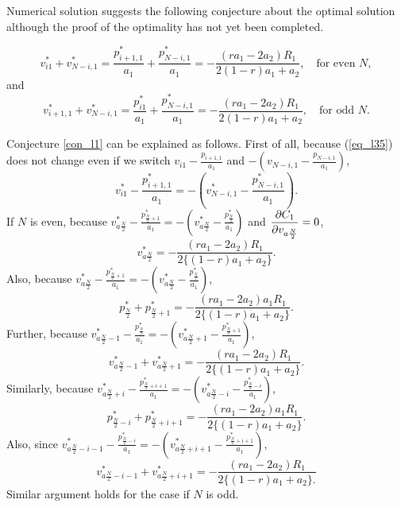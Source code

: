 Numerical solution suggests the following conjecture about the optimal solution although the proof of the optimality has not yet been completed. 
\begin{conjecture}\label{con_l1}
\begin{equation} \label{eq_l40}
 v_{i1}^*+v_{N-i,1}^* = \frac{p_{i+1,1}^*}{a_1} + \frac{p_{N-i,1}^*}{a_1} = -\frac{(ra_1-2a_2)R_1}{2{(1-r)a_1+a_2}}, \quad \mbox{for even } N,
\end{equation}
and
\begin{equation} \label{eq_l41}
 v_{i+1,1}^*+v_{N-i,1}^* = \frac{p_{i1}^*}{a_1} + \frac{p_{N-i,1}^*}{a_1} = -\frac{(ra_1-2a_2)R_1}{2{(1-r)a_1+a_2}}, \quad \mbox{for odd } N.
\end{equation}
\end{conjecture}

Conjecture \ref{con_l1} can be explained as follows.  First of all, because (\ref{eq_l35}) does not change even if we switch $\displaystyle v_{i1}-\frac{p_{i+1,1}}{a_1}$ and $\displaystyle -\left(v_{N-i,1}-\frac{p_{N-i,1}}{a_1}\right)$,
\[ %
  v_{i1}^*-\frac{p_{i+1,1}^*}{a_1}=-\left(v_{N-i,1}^*-\frac{p_{N-i,1}^*}{a_1}\right).  
\] %
If $N$ is even, because $\displaystyle v_{a\frac{N}{2}}^*-\frac{p_{\frac{N}{2}+1}^*}{a_1}=-(v_{a\frac{N}{2}}^*-\frac{p_{\frac{N}{2}}^*}{a_1})$ and $\displaystyle \frac{\partial C_1}{\partial v_{a\frac{N}{2}}}=0$,
\[ %
  v_{a\frac{N}{2}}^*=-\frac{(ra_1-2a_2)R_1}{2\{(1-r)a_1+a_2\}}.
\] %
Also, because $\displaystyle v_{a\frac{N}{2}}^*-\frac{p_{\frac{N}{2}+1}^*}{a_1}=-(v_{a\frac{N}{2}}^*-\frac{p_{\frac{N}{2}}^*}{a_1})$,
\[ %
  p_{\frac{N}{2}}^*+p_{\frac{N}{2}+1}^*=-\frac{(ra_1-2a_2)a_1R_1}{2\{(1-r)a_1+a_2\}}.
\] %
Further, because $\displaystyle v_{a\frac{N}{2}-1}^*-\frac{p_{\frac{N}{2}}^*}{a_1}=-(v_{a\frac{N}{2}+1}^*-\frac{p_{\frac{N}{2}+1}^*}{a_1})$,
\[ %
v_{a\frac{N}{2}-1}^*+v_{a\frac{N}{2}+1}^*=-\frac{(ra_1-2a_2)R_1}{2\{(1-r)a_1+a_2\}}.
\] %
Similarly, because $\displaystyle v_{a\frac{N}{2}+i}^*-\frac{p_{\frac{N}{2}+i+1}^*}{a_1}=-(v_{a\frac{N}{2}-i}^*-\frac{p_{\frac{N}{2}-i}^*}{a_1})$,
\[ %
p_{\frac{N}{2}-i}^*+p_{\frac{N}{2}+i+1}^*=-\frac{(ra_1-2a_2)a_1R_1}{2\{(1-r)a_1+a_2\}}.
\] %
Also, since $\displaystyle v_{a\frac{N}{2}-i-1}^*-\frac{p_{\frac{N}{2}-i}^*}{a_1}=-(v_{a\frac{N}{2}+i+1}^*-\frac{p_{\frac{N}{2}+i+1}^*}{a_1})$,
\[ %
v_{a\frac{N}{2}-i-1}^*+v_{a\frac{N}{2}+i+1}^*=-\frac{(ra_1-2a_2)R_1}{2\{(1-r)a_1+a_2\}.}
\] %
Similar argument holds for the case if $N$ is odd.

